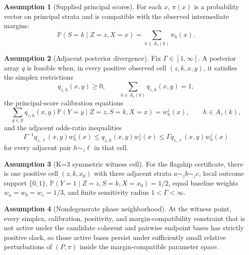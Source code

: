 \documentclass[11pt]{article}
\renewcommand{\Pr}{\mathbb{P}}
\theoremstyle{definition}
\newtheorem{assumption}{Assumption}
\theoremstyle{plain}
\theoremstyle{remark}
\begin{document}
\begin{assumption}[Supplied principal scores]\label{ass:principal-scores}
For each \(x\), \(\pi(x)\) is a probability vector on principal strata and is compatible with the observed intermediate margins:
\[
  \Pr(S=k\mid Z=z,X=x)=\sum_{h\in A_z(k)}\pi_h(x).
\]
\end{assumption}

\begin{assumption}[Adjacent posterior divergence]\label{ass:divergence}
Fix \(\Gamma\in[1,\infty]\).  A posterior array \(q\) is feasible when, in every positive observed cell \((z,k,x,y)\), it satisfies the simplex restrictions
\[
  q_{z,h}(x,y)\ge 0,\qquad \sum_{h\in A_z(k)}q_{z,h}(x,y)=1,
\]
the principal-score calibration equations
\[
  \sum_{y\in\mathcal Y} q_{z,h}(x,y)\Pr(Y=y\mid Z=z,S=k,X=x)=w_h^z(x),\qquad h\in A_z(k),
\]
and the adjacent odds-ratio inequalities
\[
  \Gamma^{-1}q_{z,\ell}(x,y)w_h^z(x)
  \le q_{z,h}(x,y)w_\ell^z(x)
  \le \Gamma q_{z,\ell}(x,y)w_h^z(x)
\]
for every adjacent pair \(h\sim_z \ell\) in that cell.
\end{assumption}

\begin{assumption}[K=3 symmetric witness cell]\label{ass:witness-cell}
For the flagship certificate, there is one positive cell \((z,k,x_0)\) with three adjacent strata \(a\sim_z b\sim_z c\), local outcome support \(\{0,1\}\), \(\Pr(Y=1\mid Z=z,S=k,X=x_0)=1/2\), equal baseline weights \(w_a=w_b=w_c=1/3\), and finite sensitivity radius \(1<\Gamma<\infty\).
\end{assumption}

\begin{assumption}[Nondegenerate phase neighborhood]\label{ass:phase-neighborhood}
At the witness point, every simplex, calibration, positivity, and margin-compatibility constraint that is not active under the candidate coherent and pairwise endpoint bases has strictly positive slack, so those active bases persist under sufficiently small relative perturbations of \((P,\pi)\) inside the margin-compatible parameter space.
\end{assumption}
\end{document}
